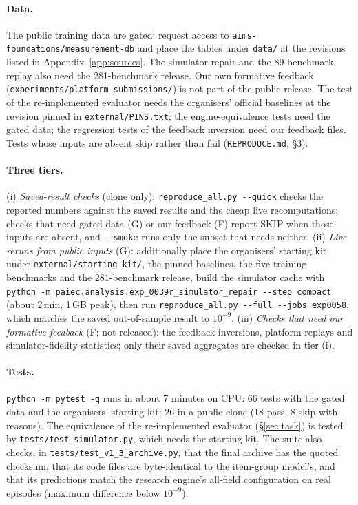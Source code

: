 \documentclass{article}
\newcommand{\p}[1]{\nolinkurl{#1}}
\begin{document}
\paragraph{Data.} The public training data are gated: request access to \p{aims-foundations/measurement-db} and
place the tables under \texttt{data/} at the revisions listed in Appendix~\ref{app:sources}. The simulator repair and
the 89-benchmark replay also need the 281-benchmark release. Our own formative feedback
(\texttt{experiments/platform\_submissions/}) is not part of the public release. The test of the re-implemented evaluator needs
the organisers' official baselines at the revision pinned in \texttt{external/PINS.txt}; the engine-equivalence tests need the gated data; the regression
tests of the feedback inversion need our feedback files. Tests whose inputs are absent skip rather than fail
(\texttt{REPRODUCE.md}, \S3).

\paragraph{Three tiers.} (i) \emph{Saved-result checks} (clone only): \texttt{reproduce\_all.py -{}-quick} checks the reported numbers against the saved results and the cheap live recomputations; checks that need gated data (G) or our feedback (F) report SKIP when those inputs are absent, and \texttt{-{}-smoke} runs only the subset that needs neither. (ii) \emph{Live reruns from public inputs} (G): additionally place
the organisers' starting kit under \texttt{external/starting\_kit/}, the pinned baselines, the five training
benchmarks and the 281-benchmark release, build the simulator cache with
\texttt{python -m paiec.analysis.exp\_0039r\_simulator\_repair -{}-step compact} (about 2\,min, 1\,GB peak), then run
\texttt{reproduce\_all.py -{}-full -{}-jobs exp0058}, which matches the saved out-of-sample result to $10^{-9}$.
(iii) \emph{Checks that need our formative feedback} (F; not released): the feedback inversions, platform replays and
simulator-fidelity statistics; only their saved aggregates are checked in tier (i).

\paragraph{Tests.} \texttt{python -m pytest -q} runs in about 7 minutes on CPU: 66 tests with the gated data and the
organisers' starting kit; 26 in a public clone (18 pass, 8 skip with reasons). The equivalence of the
re-implemented evaluator (\S\ref{sec:task}) is tested by \texttt{tests/test\_simulator.py}, which needs the starting kit. The suite also checks,
in \texttt{tests/test\_v1\_3\_archive.py}, that the final archive
has the quoted checksum, that its code files are byte-identical to the item-group model's, and that its predictions
match the research engine's all-field configuration on real episodes (maximum difference below $10^{-9}$).
\end{document}
